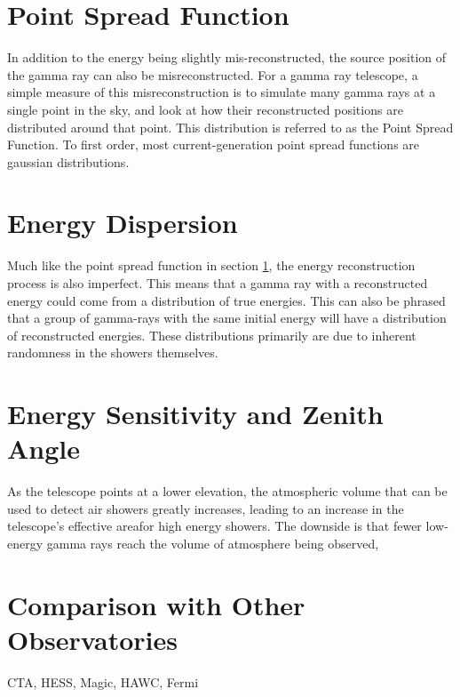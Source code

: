 \section{Point Spread Function}\label{sec:psf}
In addition to the energy being slightly mis-reconstructed, the source position of the gamma ray can also be misreconstructed.
For a gamma ray telescope, a simple measure of this misreconstruction is to simulate many gamma rays at a single point in the sky, and look at how their reconstructed positions are distributed around that point.
This distribution is referred to as the Point Spread Function.
To first order, most current-generation point spread functions are gaussian distributions.


\section{Energy Dispersion}
Much like the point spread function in section \ref{sec:psf}, the energy reconstruction process is also imperfect.
This means that a gamma ray with a reconstructed energy could come from a distribution of true energies.
This can also be phrased that a group of gamma-rays with the same initial energy will have a distribution of reconstructed energies.
These distributions primarily are due to inherent randomness in the showers themselves.


\section{Energy Sensitivity and Zenith Angle}

As the telescope points at a lower elevation, the atmospheric volume that can be used to detect air showers greatly increases, leading to an increase in the telescope's effective areafor high energy showers.
The downside is that fewer low-energy gamma rays reach the volume of atmosphere being observed, 


\section{Comparison with Other Observatories}


CTA, HESS, Magic, HAWC, Fermi
